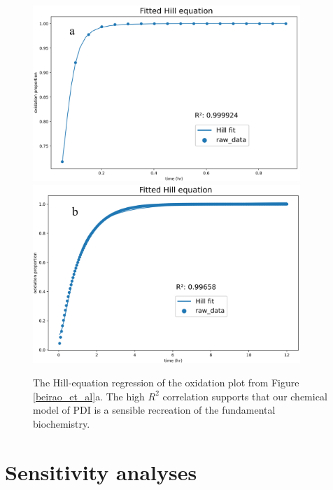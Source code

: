 \begin{figure}
    \centering
    \includegraphics[width = 0.9\textwidth]{images/PDIpy/examples/20uM_regression.png}
    \vspace{5mm}
    \midrule
    \vspace{5mm}
    \includegraphics[width = 0.9\textwidth]{images/PDIpy/examples/10uM_biofilm_regression.png}
    \caption{
        The Hill-equation regression of the oxidation plot from Figure \ref{beirao_et_al}a. The high $R^2$ correlation supports that our chemical model of PDI is a sensible recreation of the fundamental biochemistry.
    }
    \label{hill_regression}
\end{figure}


\section{Sensitivity analyses}

